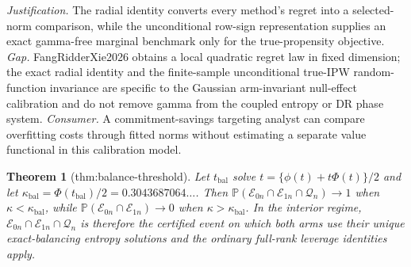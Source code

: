 \documentclass{article}
\newtheorem{theorem}{Theorem}
\begin{document}
\par\smallskip\noindent \textit{Justification.} The radial identity converts every method's regret into a selected-norm comparison, while the unconditional row-sign representation supplies an exact gamma-free marginal benchmark only for the true-propensity objective. \textit{Gap.} FangRidderXie2026 obtains a local quadratic regret law in fixed dimension; the exact radial identity and the finite-sample unconditional true-IPW random-function invariance are specific to the Gaussian arm-invariant null-effect calibration and do not remove gamma from the coupled entropy or DR phase system. \textit{Consumer.} A commitment-savings targeting analyst can compare overfitting costs through fitted norms without estimating a separate value functional in this calibration model.

\begin{theorem}[thm:balance-threshold]\label{thm:balance-threshold}
Let \(t_{\mathrm{bal}}\) solve \(t=\{\phi(t)+t\Phi(t)\}/2\) and let \(\kappa_{\mathrm{bal}}=\Phi(t_{\mathrm{bal}})/2=0.3043687064\ldots\). Then \(\mathbb P(\mathcal E_{0n}\cap\mathcal E_{1n}\cap\mathcal Q_n)\to1\) when \(\kappa<\kappa_{\mathrm{bal}}\), while \(\mathbb P(\mathcal E_{0n}\cap\mathcal E_{1n})\to0\) when \(\kappa>\kappa_{\mathrm{bal}}\). In the interior regime, \(\mathcal E_{0n}\cap\mathcal E_{1n}\cap\mathcal Q_n\) is therefore the certified event on which both arms use their unique exact-balancing entropy solutions and the ordinary full-rank leverage identities apply.
\end{theorem}
\end{document}
